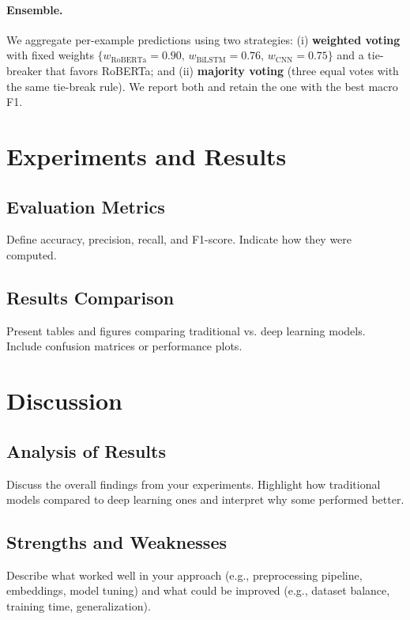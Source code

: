 \documentclass[10pt]{article}
\begin{document}
\paragraph{Ensemble.}
We aggregate per-example predictions using two strategies: (i) \textbf{weighted voting} with fixed weights $\{w_{\text{RoBERTa}}=0.90,\,w_{\text{BiLSTM}}=0.76,\,w_{\text{CNN}}=0.75\}$ and a tie-breaker that favors RoBERTa; and (ii) \textbf{majority voting} (three equal votes with the same tie-break rule). We report both and retain the one with the best macro F1.
\section{Experiments and Results}
\subsection{Evaluation Metrics} %
Define accuracy, precision, recall, and F1-score. Indicate how they were computed.

\subsection{Results Comparison} %
Present tables and figures comparing traditional vs. deep learning models. Include confusion matrices or performance plots.

\section{Discussion}
\subsection{Analysis of Results}
Discuss the overall findings from your experiments. Highlight how traditional models compared to deep learning ones and interpret why some performed better.

\subsection{Strengths and Weaknesses}
Describe what worked well in your approach (e.g., preprocessing pipeline, embeddings, model tuning) and what could be improved (e.g., dataset balance, training time, generalization).
\end{document}
